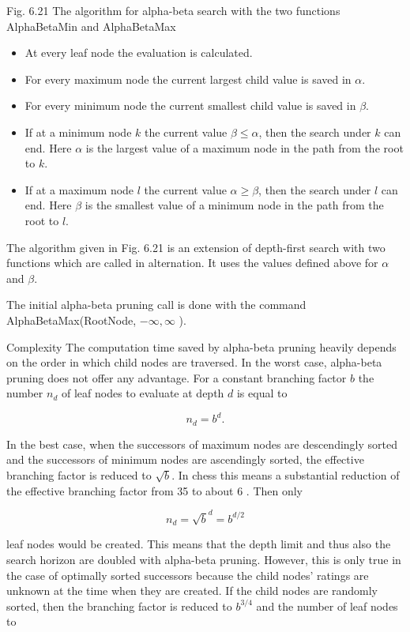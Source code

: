 \documentclass[10pt]{book}
\begin{document}
Fig. 6.21 The algorithm for alpha-beta search with the two functions AlphaBetaMin and AlphaBetaMax

\begin{itemize}
  \item At every leaf node the evaluation is calculated.
  \item For every maximum node the current largest child value is saved in $\alpha$.
  \item For every minimum node the current smallest child value is saved in $\beta$.
  \item If at a minimum node $k$ the current value $\beta \leq \alpha$, then the search under $k$ can end. Here $\alpha$ is the largest value of a maximum node in the path from the root to $k$.
  \item If at a maximum node $l$ the current value $\alpha \geq \beta$, then the search under $l$ can end. Here $\beta$ is the smallest value of a minimum node in the path from the root to $l$.
\end{itemize}

The algorithm given in Fig. 6.21 is an extension of depth-first search with two functions which are called in alternation. It uses the values defined above for $\alpha$ and $\beta$.

The initial alpha-beta pruning call is done with the command\\
AlphaBetaMax(RootNode, $-\infty, \infty$ ).

Complexity The computation time saved by alpha-beta pruning heavily depends on the order in which child nodes are traversed. In the worst case, alpha-beta\\
pruning does not offer any advantage. For a constant branching factor $b$ the number $n_{d}$ of leaf nodes to evaluate at depth $d$ is equal to

$$
n_{d}=b^{d} .
$$

In the best case, when the successors of maximum nodes are descendingly sorted and the successors of minimum nodes are ascendingly sorted, the effective branching factor is reduced to $\sqrt{b}$. In chess this means a substantial reduction of the effective branching factor from 35 to about 6 . Then only

$$
n_{d}=\sqrt{b}^{d}=b^{d / 2}
$$

leaf nodes would be created. This means that the depth limit and thus also the search horizon are doubled with alpha-beta pruning. However, this is only true in the case of optimally sorted successors because the child nodes' ratings are unknown at the time when they are created. If the child nodes are randomly sorted, then the branching factor is reduced to $b^{3 / 4}$ and the number of leaf nodes to
\end{document}
